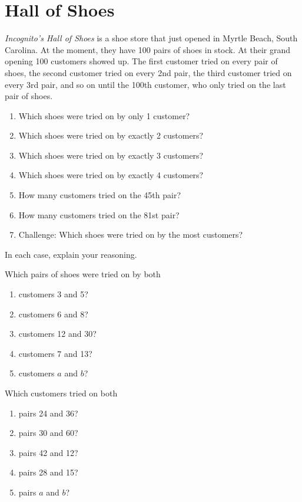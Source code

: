 \newpage
\section{Hall of Shoes}\label{A:Hall}
  
\begin{prob}  
\textit{Incognito's Hall of Shoes} is a shoe store that just
  opened in Myrtle Beach, South Carolina. At the moment, they have 100
  pairs of shoes in stock. At their grand opening 100 customers showed
  up. The first customer tried on every pair of shoes, the second
  customer tried on every 2nd pair, the third customer tried on every
  3rd pair, and so on until the 100th customer, who only tried on the
  last pair of shoes.
\begin{enumerate}
\item Which shoes were tried on by only 1 customer?
\item Which shoes were tried on by exactly 2 customers?
\item Which shoes were tried on by exactly 3 customers?
\item Which shoes were tried on by exactly 4 customers?
\item How many customers tried on the 45th pair?  
\item How many customers tried on the 81st pair?  
\item Challenge:  Which shoes were tried on by the most customers?  
\end{enumerate}
In each case, explain your reasoning.
\end{prob}

\begin{prob}
Which pairs of shoes were tried on by both 
\begin{enumerate}
\item customers 3 and 5?
\item customers 6 and 8?
\item customers 12 and 30?
\item customers 7 and 13?
\item customers $a$ and $b$?  
\end{enumerate}
\end{prob}

\begin{prob}
Which customers tried on both 
\begin{enumerate}
\item pairs 24 and 36?
\item pairs 30 and 60?
\item pairs 42 and 12?
\item pairs 28 and 15?
\item pairs $a$ and $b$?  
\end{enumerate}
\end{prob}



